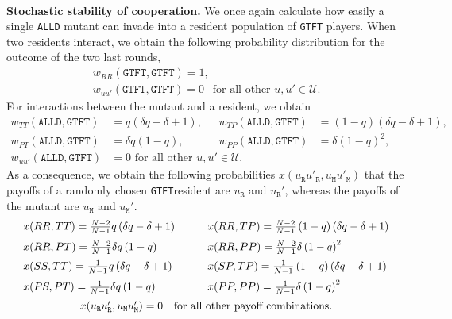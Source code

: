 \documentclass[11pt]{article}
\def\alld{\texttt{ALLD}}
\def\gtft{\texttt{GTFT}}
\def\resident{\texttt{R}}
\def\mutant{\texttt{M}}
\theoremstyle{plainCl1}
\theoremstyle{plainCl2}
\begin{document}
 
 ~\\
 \noindent
 {\bf Stochastic stability of cooperation.}
We once again calculate how easily a single \alld{} mutant can invade into a
resident population of \gtft{} players. When two residents interact,
we obtain the following probability distribution for the outcome of the two last rounds, 
\begin{equation*}
\begin{array}{ll}
    w_{RR}(\gtft,\gtft) =  1,\\
    w_{uu'}(\gtft, \gtft) =   0~~ \text{ for all other } u,u'\in \mathcal{U}.
\end{array}
\end{equation*}
For interactions between the mutant and a resident, we obtain
\begin{align*}
    w_{TT} (\alld,\gtft) & = q \left(\delta q - \delta + 1\right), & 
    w_{TP}(\alld,\gtft) & =  \left(1 - q\right) \left(\delta q - \delta + 1\right), \\
    w_{PT} (\alld,\gtft) & = \delta q \left(1 - q\right), & 
    w_{PP} (\alld,\gtft) & = \delta \left(1-q\right)^{2},\\
    w_{uu'}(\alld,\gtft) & =  0 \text{ for all other } u,u' \in \mathcal{U}.
\end{align*}
As a consequence, we obtain the following probabilities  $x(u_\resident u'_\resident, u_\mutant u'_\mutant)$ that the
payoffs of a randomly chosen \gtft resident are $u_\resident$ and $u_\resident'$, whereas the payoffs of the mutant are $u_\mutant$ and $u_\mutant'$. 
\begin{equation*}
  \setlength{\arraycolsep}{15pt}
\begin{array}{ll}
  x(RR, TT) =  \frac{N-2}{N - 1}  q \left(\delta q - \delta + 1\right) 
  &x(RR, TP) =  \frac{N-2}{N - 1} \left(1-q\right) \left(\delta q - \delta + 1\right)\\[0.2cm]
  x(RR, PT) =  \frac{N-2}{N - 1} \delta q  \left(1-q\right) 
  &x(RR, PP) =  \frac{N-2}{N - 1} \delta  \left(1 - q\right)^{2}\\[0.2cm]
  x(SS, TT) =  \frac{1}{N -1} q \left(\delta q - \delta + 1\right) 
  &x(SP, TP) =  \frac{1}{N -1} \left(1-q\right) \left(\delta q - \delta + 1\right) \\[0.2cm]
  x(PS,PT) =   \frac{1}{N -1}\delta q \left(1-q\right) 
  &x(PP, PP) =  \frac{1}{N -1}\delta \left(1-q\right)^{2}\\[0.2cm]
  \multicolumn{2}{c}{x(u_\resident u'_\resident, u_\mutant u'_\mutant) =  0~~ \text{ for all other payoff combinations.}}
\end{array}
\end{equation*}
\end{document}
